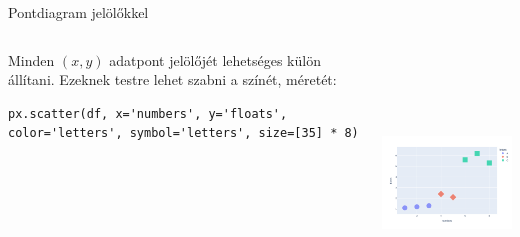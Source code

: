 \documentclass[english, aspectratio=169]{beamer}
\begin{document}
	\begin{frame}[fragile]{Pontdiagram jelölőkkel}
		\begin{columns}
			\begin{column}{.5\textwidth}
				Minden $\left(x,y\right)$ adatpont jelölőjét lehetséges külön állítani. Ezeknek testre lehet szabni a színét, méretét:
				\vspace{0.3cm}
				\begin{lstlisting}
px.scatter(df, x='numbers', y='floats', color='letters', symbol='letters', size=[35] * 8)			
				\end{lstlisting}
			\end{column}
			\begin{column}{.5\textwidth}
				\begin{center}
					\includegraphics[width=7cm, height=7cm, keepaspectratio]{images/plots_10.png}
				\end{center}
			\end{column}
		\end{columns}
	\end{frame}
	
\end{document}
